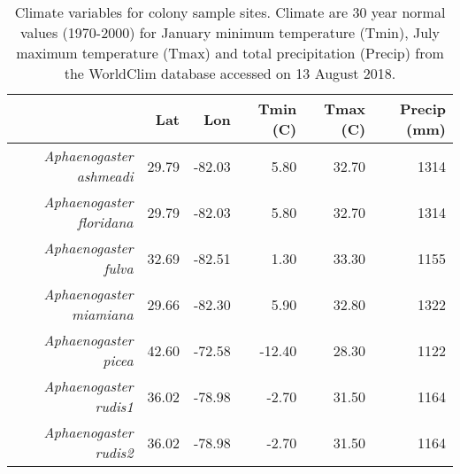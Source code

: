 \begin{table}[ht]
\centering
\begin{tabular}{rrrrrr}
  \hline
 & Lat & Lon & Tmin (C) & Tmax (C) & Precip (mm) \\ 
  \hline
{\emph{Aphaenogaster ashmeadi}} & 29.79 & -82.03 & 5.80 & 32.70 & 1314 \\ 
  {\emph{Aphaenogaster floridana}} & 29.79 & -82.03 & 5.80 & 32.70 & 1314 \\ 
  {\emph{Aphaenogaster fulva}} & 32.69 & -82.51 & 1.30 & 33.30 & 1155 \\ 
  {\emph{Aphaenogaster miamiana}} & 29.66 & -82.30 & 5.90 & 32.80 & 1322 \\ 
  {\emph{Aphaenogaster picea}} & 42.60 & -72.58 & -12.40 & 28.30 & 1122 \\ 
  {\emph{Aphaenogaster rudis1}} & 36.02 & -78.98 & -2.70 & 31.50 & 1164 \\ 
  {\emph{Aphaenogaster rudis2}} & 36.02 & -78.98 & -2.70 & 31.50 & 1164 \\ 
   \hline
\end{tabular}
\caption{Climate variables for colony sample sites. Climate are 30 year normal values (1970-2000) for January minimum temperature (Tmin), July maximum temperature (Tmax) and total precipitation (Precip) from the WorldClim database accessed on 13 August 2018.} 
\label{tab:climate}
\end{table}
